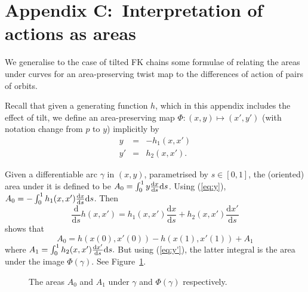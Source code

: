 \documentclass[12pt]{article}
\newcounter{number}
\renewcommand{\thelemma}{\thesection.\thenumber}
\renewcommand{\theequation}{\arabic{section}.\arabic{equation}}
\begin{document}
\section*{Appendix C:~Interpretation of actions as areas}
 \setcounter{theorem}{0}
 \setcounter{equation}{0}
 \setcounter{lemma}{0}
 \renewcommand{\theequation}{C.\arabic{equation}}
\renewcommand{\thelemma}{C.\arabic{lemma}}

We generalise to the case of tilted FK chains some formulae of \cite{MMP} relating the areas under curves for an area-preserving twist map to the differences of action of pairs of orbits.

Recall that given a generating function $h$, which in this appendix includes the effect of tilt, we define an area-preserving map $\Phi: (x,y) \mapsto (x',y')$ (with notation change from $p$ to $y$) implicitly by
\begin{eqnarray}
y &=& -h_1(x,x') \label{eq:y} \\
y' &=& h_2(x,x'). \label{eq:y'}
\end{eqnarray}

Given a differentiable arc $\gamma$ in $(x,y)$, parametrised by $s \in [0,1]$, the (oriented) area under it is defined to be $A_0 = \int_0^1 y \frac{\mbox{\scriptsize d}x}{\mbox{\scriptsize d}s} \mbox{d}s$.  Using (\ref{eq:y}), $A_0 = - \int_0^1 h_1(x,x') \frac{\mbox{\scriptsize d}x}{\mbox{\scriptsize d}s} \mbox{d}s$.  Then
 $$
\frac{\mbox{d}}{\mbox{d}s}h(x,x') = h_1(x,x')\frac{\mbox{d}x}{\mbox{d}s} + h_2(x,x')\frac{\mbox{d}x'}{\mbox{d}s}
$$
shows that
\begin{equation}
A_0 = h(x(0),x'(0))-h(x(1),x'(1)) + A_1
\label{eq:A01}
\end{equation}
where
$A_1 = \int_0^1 h_2(x,x') \frac{\mbox{\scriptsize d}x'}{\mbox{\scriptsize d}s} \mbox{d}s.$
But using (\ref{eq:y'}), the latter integral is the area under the image $\Phi(\gamma)$.
See Figure~\ref{fig:A0A1}.
\begin{figure}[htbp] %
   \centering
   \caption{The areas $A_0$ and $A_1$ under $\gamma$ and $\Phi(\gamma)$ respectively.}
   \label{fig:A0A1}
\end{figure}
\end{document}
